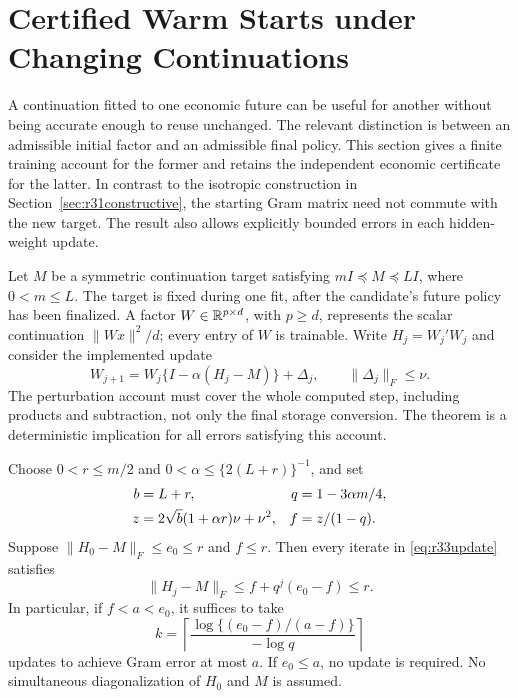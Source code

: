 \section{Certified Warm Starts under Changing Continuations}\label{sec:r33warm}
A continuation fitted to one economic future can be useful for another without
being accurate enough to reuse unchanged. The relevant distinction is between
an admissible initial factor and an admissible final policy. This section gives
a finite training account for the former and retains the independent economic
certificate for the latter. In contrast to the isotropic construction in
Section~\ref{sec:r31constructive}, the starting Gram matrix need not commute
with the new target. The result also allows explicitly bounded errors in each
hidden-weight update.

Let $M$ be a symmetric continuation target satisfying
$mI\preceq M\preceq LI$, where $0<m\leq L$. The target is fixed during
one fit, after the candidate's future policy has been finalized. A factor
$W\in\mathbb R^{p\times d}$, with $p\geq d$, represents the scalar continuation
$\|Wx\|^2/d$; every entry of $W$ is trainable. Write
$H_j=W_j'W_j$ and consider the implemented update
\begin{equation}\label{eq:r33update}
 W_{j+1}=W_j\{I-\alpha(H_j-M)\}+\Delta_j,
 \qquad \|\Delta_j\|_F\leq\nu.
\end{equation}
The perturbation account must cover the whole computed step, including
products and subtraction, not only the final storage conversion. The theorem
is a deterministic implication for all errors satisfying this account.

\begin{theorem}\label{thm:r33warm}
Choose $0<r\leq m/2$ and $0<\alpha\leq\{2(L+r)\}^{-1}$, and set
\begin{align}
 b&=L+r, & q&=1-3\alpha m/4,\notag\\
 z&=2\sqrt b(1+\alpha r)\nu+\nu^2,&
 f&=z/(1-q).\label{eq:r33noise}
\end{align}
Suppose $\|H_0-M\|_F\leq e_0\leq r$ and $f\leq r$. Then every iterate
in \eqref{eq:r33update} satisfies
\begin{equation}\label{eq:r33envelope}
 \|H_j-M\|_F\leq f+q^j(e_0-f)\leq r.
\end{equation}
In particular, if $f<a<e_0$, it suffices to take
\begin{equation}\label{eq:r33cap}
 k=\left\lceil\frac{\log\{(e_0-f)/(a-f)\}}{-\log q}\right\rceil
\end{equation}
updates to achieve Gram error at most $a$. If $e_0\leq a$, no update is
required. No simultaneous diagonalization of $H_0$ and $M$ is assumed.
\end{theorem}

